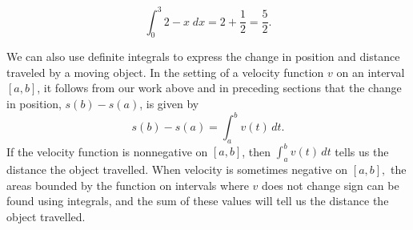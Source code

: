\begin{solution}
\begin{enumerate}
\begin{minipage}[c]{.3\textwidth}
\end{minipage}
\begin{minipage}[c]{.5\textwidth}
\begin{center}
\[
\int_{0}^{3} 2-x\; dx = 2+\frac12=\frac52.
\]
\end{center}
\end{minipage}


\end{enumerate}
\end{solution}






We can also use definite integrals to express the change in position and distance traveled by a moving object.  In the setting of a velocity function $v$ on an interval $[a,b]$, it follows from our work above and in preceding sections that the change in position, $s(b) - s(a)$, is given by
$$s(b) - s(a) = \int_a^b v(t) \, dt.$$
If the velocity function is nonnegative on $[a,b]$, then $\int_a^b v(t) \,dt$ tells us the distance the object travelled.  When velocity is sometimes negative on $[a,b],$ the areas bounded by the function on intervals where $v$ does not change sign can be found using integrals, and the sum of these values will tell us the distance the object travelled. 

